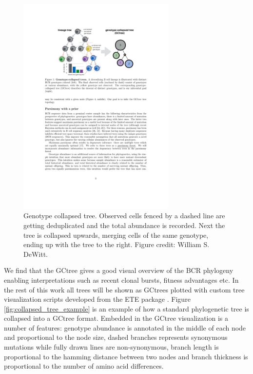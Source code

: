 \begin{figure}[!ht]
    \centering
    \includegraphics[width=0.7\textwidth]{figures/GCtree_illu.pdf}
    \caption{
        \label{fig:GCtree_illu}
        Genotype collapsed tree.
        Observed cells fenced by a dashed line are getting deduplicated and the total abundance is recorded.
        Next the tree is collapsed upwards, merging cells of the same genotype, ending up with the tree to the right.
        Figure credit: William S. DeWitt.
    }
\end{figure}


We find that the GCtree gives a good visual overview of the BCR phylogeny enabling interpretations such as recent clonal bursts, fitness advantages etc.
In the rest of this work all trees will be shown as GCtrees plotted with custom tree visualization scripts developed from the ETE package \cite{huerta2016ete}.
Figure \ref{fig:collapsed_tree_example} is an example of how a standard phylogenetic tree is collapsed into a GCtree format.
Embedded in the GCtree visualization is a number of features: genotype abundance is annotated in the middle of each node and proportional to the node size, dashed branches represents synonymous mutations while fully drawn lines are non-synonymous, branch length is proportional to the hamming distance between two nodes and branch thickness is proportional to the number of amino acid differences.

